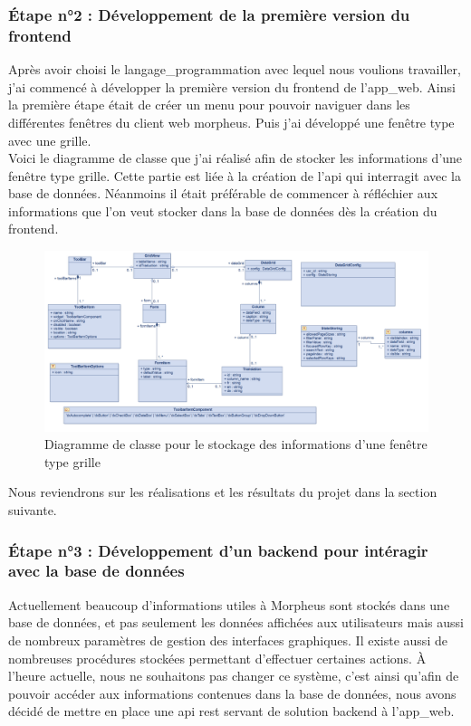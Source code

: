 \documentclass[a4paper, 12pt, french]{article}
\begin{document}
				\subsubsection{Étape n°2 : Développement de la première version du \gls{frontend}}
					Après avoir choisi le \gls{langage_programmation} avec lequel nous voulions travailler, j'ai commencé à développer la première version du \gls{frontend} de l'\gls{app_web}. Ainsi la première étape était de créer un menu pour pouvoir naviguer dans les différentes fenêtres du client web morpheus. Puis j'ai développé une fenêtre type avec une grille.\\
					
					Voici le diagramme de classe que j'ai réalisé afin de stocker les informations d'une fenêtre type grille. Cette partie est liée à la création de l'\acrshort{api} qui interragit avec la base de données. Néanmoins il était préférable de commencer à réfléchier aux informations que l'on veut stocker dans la base de données dès la création du \gls{frontend}.

					\begin{figure}[ht!]
						\begin{center}
							\includegraphics[width=0.7\linewidth]{images/diagramme_classes.png}
						\end{center}
						\caption{Diagramme de classe pour le stockage des informations d'une fenêtre type grille}
						\label{fig:diagramme_classes}
					\end{figure}
					
					\noindent Nous reviendrons sur les réalisations et les résultats du projet dans la section suivante.
				\newpage
				\subsubsection{Étape n°3 : Développement d'un \gls{backend} pour intéragir avec la base de données}
					Actuellement beaucoup d'informations utiles à Morpheus sont stockés dans une base de données, et pas seulement les données affichées aux utilisateurs mais aussi de nombreux paramètres de gestion des interfaces graphiques. Il existe aussi de nombreuses procédures stockées permettant d'effectuer certaines actions. À l'heure actuelle, nous ne souhaitons pas changer ce système, c'est ainsi qu'afin de pouvoir accéder aux informations contenues dans la base de données, nous avons décidé de mettre en place une \acrshort{api} \acrshort{rest} servant de solution \gls{backend} à l'\gls{app_web}.\\ 
\end{document}
